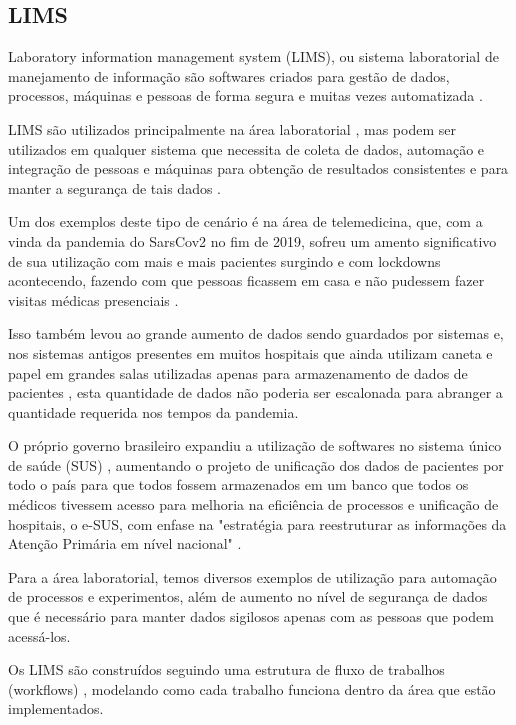 \subsection{LIMS}


Laboratory information management system (LIMS), ou sistema laboratorial de manejamento de informação são softwares criados para gestão de dados, processos, máquinas e pessoas de forma segura e muitas vezes automatizada \cite{Stafford1998LIMS:Technology}.


LIMS são utilizados principalmente na área laboratorial \R, mas podem ser utilizados em qualquer sistema que necessita de coleta de dados, automação e integração de pessoas e máquinas para obtenção de resultados consistentes e para manter a segurança de tais dados \R.

Um dos exemplos deste tipo de cenário é na área de telemedicina, que, com a vinda da pandemia do SarsCov2 no fim de 2019, sofreu um amento significativo de sua utilização com mais e mais pacientes surgindo e com lockdowns acontecendo, fazendo com que pessoas ficassem em casa e não pudessem fazer visitas médicas presenciais \R.

Isso também levou ao grande aumento de dados sendo guardados por sistemas e, nos sistemas antigos presentes em muitos hospitais que ainda utilizam caneta e papel em grandes salas utilizadas apenas para armazenamento de dados de pacientes \R, esta quantidade de dados não poderia ser escalonada para abranger a quantidade requerida nos tempos da pandemia.


O próprio governo brasileiro expandiu a utilização de softwares no sistema único de saúde (SUS) \R, aumentando o projeto de unificação dos dados de pacientes por todo o país para que todos fossem armazenados em um banco que todos os médicos tivessem acesso para melhoria na eficiência de processos e unificação de hospitais, o  e-SUS, com enfase na "estratégia para reestruturar as informações da Atenção Primária em nível nacional" \R.

Para a área laboratorial, temos diversos exemplos de utilização para automação de processos e experimentos, além de aumento no nível de segurança de dados que é necessário para manter dados sigilosos apenas com as pessoas que podem acessá-los. \NO

Os LIMS são construídos seguindo uma estrutura de fluxo de trabalhos (workflows) \R, modelando como cada trabalho funciona dentro da área que estão implementados. \NO

